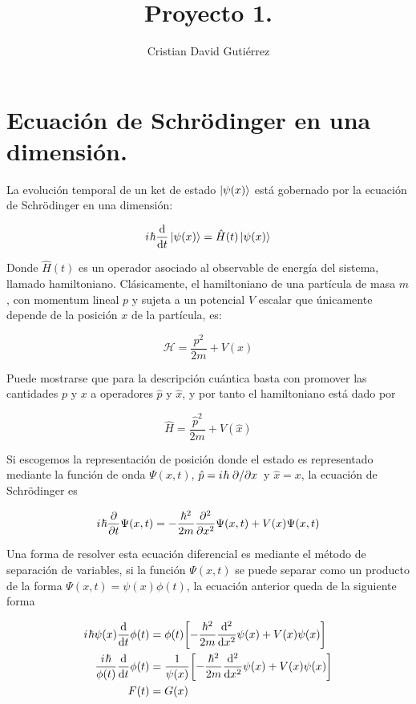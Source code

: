 \documentclass{article}
\title{Proyecto 1.}
\author{Cristian David Gutiérrez}
\date{}
\newcommand{\iu}{{i\mkern1mu}}
\begin{document}
\maketitle

\section{Ecuación de Schrödinger en una dimensión.}

La evolución temporal de un ket de estado $\ket{\psi(x)}$ está gobernado por la ecuación de Schrödinger en una dimensión:

\begin{equation*}
    \iu\hbar\dv{t}\ket{\psi(x)}=\hat{H}(t)\ket{\psi(x)}
\end{equation*}

Donde $\hat{H}(t)$ es un operador asociado al observable de energía del sistema, llamado hamiltoniano. Clásicamente, el hamiltoniano de una partícula de masa $m$, con momentum lineal $p$ y sujeta a un potencial $V$ escalar que únicamente depende de la posición $x$ de la partícula, es:

\begin{equation*}
    \mathcal{H}=\frac{p^2}{2m}+V(x)
\end{equation*}


Puede mostrarse que para la descripción cuántica basta con promover las cantidades $p$ y $x$ a operadores $\hat{p}$ y $\hat{x}$, y por tanto el hamiltoniano está dado por

\begin{equation*}
    \hat{H}=\frac{\hat{p}^2}{2m}+V(\hat{x})
\end{equation*}

Si escogemos la representación de posición donde el estado es representado mediante la función de onda $\Psi(x,t)$,  $\hat{p}=\iu\hbar\pdv*{x}$ y $\hat{x}=x$, la ecuación de Schrödinger es

\begin{equation}
    \iu\hbar\pdv{t}\Psi(x,t)=-\frac{\hbar^2}{2m}\pdv[2]{x}\Psi(x,t)+V(x)\Psi(x,t)
\end{equation}

Una forma de resolver esta ecuación diferencial es mediante el método de separación de variables, si la función $\Psi(x,t)$ se puede separar como un producto de la forma $\Psi(x,t)=\psi(x)\phi(t)$, la ecuación anterior queda de la siguiente forma

\begin{equation*}
\begin{split}
    \iu\hbar\psi(x)\dv{t}\phi(t)&=\phi(t)\qty[-\frac{\hbar^2}{2m}\dv[2]{x}\psi(x)+V(x)\psi(x)]\\
    \frac{\iu\hbar}{\phi(t)}\dv{t}\phi(t)&=\frac{1}{\psi(x)}\qty[-\frac{\hbar^2}{2m}\dv[2]{x}\psi(x)+V(x)\psi(x)]\\
    F(t)&=G(x)
\end{split}
\end{equation*}
\end{document}
